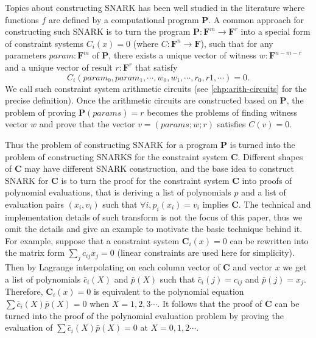 \smallskip Topics about constructing SNARK has been well studied in the literature \cite{groth2011efficient, groth2017snarky,groth2016size,groth2017snarky, bootle2016efficient,bunz2018bulletproofs, maller2019sonic, chiesa2020marlin,bunz2020transparent} where functions $f$ are defined by a computational program $\mathbf{P}$.
A common approach for constructing such SNARK is to turn the program $\mathbf{P}:\mathbf{F}^m\rightarrow \mathbf{F}^r$ into a special form of constraint systems $C_i(x) = 0$ (where $C:\mathbf{F}^n \rightarrow \mathbf{F}$), such that for any parameters $param: \mathbf{F}^m$ of $\mathbf{P}$, there exists a unique vector of witness $w:\mathbf{F}^{n-m-r}$ and a unique vector of result $r:\mathbf{F}^r$ that satisfy
\[
C_i(param_0, param_1, \cdots, w_0, w_1, \cdots, r_0, r1, \cdots) = 0.
\]
\noindent We call such constraint system arithmetic circuits (see \ref{chp:arith-circuits} for the precise definition). Once the arithmetic circuits are constructed based on $\mathbf{P}$, the problem of proving $\mathbf{P}(params) = r$ becomes the problems of finding witness vector $w$ and prove that the vector $v = (params;w;r)$ satisfies $C(v) = 0$.

\smallskip Thus the problem of constructing SNARK for a program $\mathbf{P}$ is turned into the problem of constructing SNARKS for the constraint system $\mathbf{C}$. Different shapes of $\mathbf{C}$ may have different SNARK construction, and the base idea to construct SNARK for $\mathbf{C}$ is to turn the proof for the constraint system $\mathbf{C}$ into proofs of polynomial evaluations, that is deriving a list of polynomials $p$ and a list of evaluation pairs $(x_i,v_i)$ such that $\forall i, p_i(x_i) = v_i$ implies $\mathbf{C}$. The technical and implementation details of such transform is not the focus of this paper, thus we omit the details and give an example to motivate the basic technique behind it.
For example, suppose that a constraint system $\mathbf{C}_i(x) = 0$ can be rewritten into the matrix form $\sum_j c_{ij}x_j = 0$ (linear constraints are used here for simplicity). Then by Lagrange interpolating on each column vector of $\mathbf{C}$ and vector $x$ we get a list of polynomials $\bar{c}_i(X)$ and $\bar{p}(X)$ such that $\bar{c}_i(j) = c_{ij}$ and $\bar{p}(j) = x_j$. Therefore, $\mathbf{C}_i(x) = 0$ is equivalent to the polynomial equation $\sum \bar{c}_i(X)\bar{p}(X) = 0$ when $X =1,2,3\cdots$. It follows that the proof of $\mathbf{C}$ can be turned into the proof of the polynomial evaluation problem by proving the evaluation of $\sum \bar{c}_i(X)\bar{p}(X) = 0$ at $X=0,1,2\cdots$.

